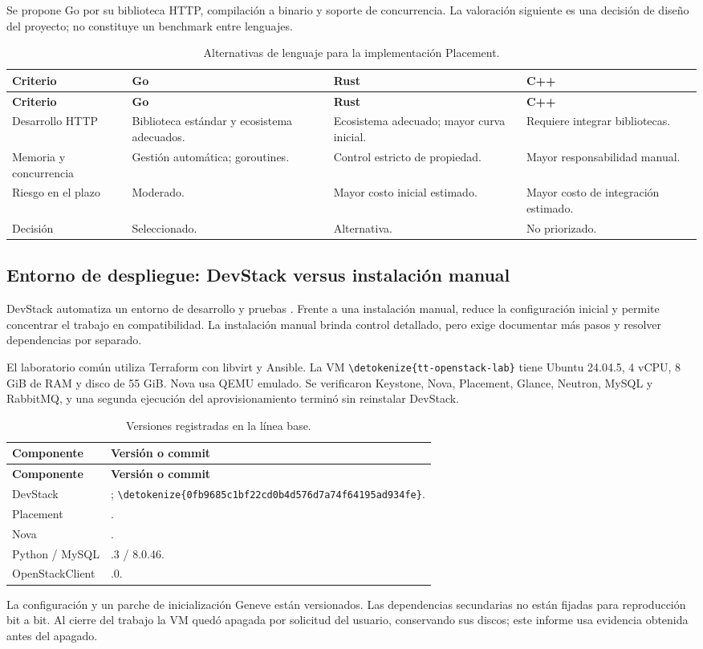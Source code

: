 \documentclass[12pt,a4paper]{article}
\newcommand{\code}[1]{{\small\expandafter\nolinkurl\expandafter{\detokenize{#1}}}}
\newcommand{\reporttable}[4]{\begingroup\small\setlength{\LTpre}{8pt}\setlength{\LTpost}{8pt}\setlength{\tabcolsep}{4pt}\renewcommand{\arraystretch}{1.15}
\begin{longtable}{#2}\caption{#1}\\\toprule #3\\\midrule\endfirsthead
\toprule #3\\\midrule\endhead\bottomrule\endfoot #4\end{longtable}\endgroup}
\begin{document}
Se propone Go por su biblioteca HTTP, compilación a binario y soporte de concurrencia. La valoración siguiente es una decisión de diseño del proyecto; no constituye un benchmark entre lenguajes.
\reporttable{Alternativas de lenguaje para la implementación Placement.}{>{\raggedright\arraybackslash}p{4.3cm}>{\raggedright\arraybackslash}p{3.2cm}>{\raggedright\arraybackslash}p{3.2cm}>{\raggedright\arraybackslash}p{3.6cm}}{\textbf{Criterio}&\textbf{Go}&\textbf{Rust}&\textbf{C++}}{
Desarrollo HTTP&Biblioteca estándar y ecosistema adecuados.&Ecosistema adecuado; mayor curva inicial.&Requiere integrar bibliotecas.\\*
Memoria y concurrencia&Gestión automática; goroutines.&Control estricto de propiedad.&Mayor responsabilidad manual.\\*
Riesgo en el plazo&Moderado.&Mayor costo inicial estimado.&Mayor costo de integración estimado.\\*
Decisión&Seleccionado.&Alternativa.&No priorizado.\\}

\subsection{Entorno de despliegue: DevStack versus instalación manual}
DevStack automatiza un entorno de desarrollo y pruebas \cite{devstack}. Frente a una instalación manual, reduce la configuración inicial y permite concentrar el trabajo en compatibilidad. La instalación manual brinda control detallado, pero exige documentar más pasos y resolver dependencias por separado.

El laboratorio común utiliza Terraform con libvirt y Ansible. La VM \code{tt-openstack-lab} tiene Ubuntu 24.04.5, 4 vCPU, 8 GiB de RAM y disco de 55 GiB. Nova usa QEMU emulado. Se verificaron Keystone, Nova, Placement, Glance, Neutron, MySQL y RabbitMQ, y una segunda ejecución del aprovisionamiento terminó sin reinstalar DevStack.

\reporttable{Versiones registradas en la línea base.}{>{\raggedright\arraybackslash}p{4cm}>{\raggedright\arraybackslash}p{11cm}}{\textbf{Componente}&\textbf{Versión o commit}}{
DevStack&\code{stable/2026.2}; \code{0fb9685c1bf22cd0b4d576d7a74f64195ad934fe}.\\*
Placement&\code{f4a89d3803cb23df22b8714569889ab39c918c34}.\\*
Nova&\code{247ea5d774305b688997f8df81c011b249eb793c}.\\*
Python / MySQL&3.12.3 / 8.0.46.\\*
OpenStackClient&10.3.0.\\}
La configuración y un parche de inicialización Geneve están versionados. Las dependencias secundarias no están fijadas para reproducción bit a bit. Al cierre del trabajo la VM quedó apagada por solicitud del usuario, conservando sus discos; este informe usa evidencia obtenida antes del apagado.
\end{document}
